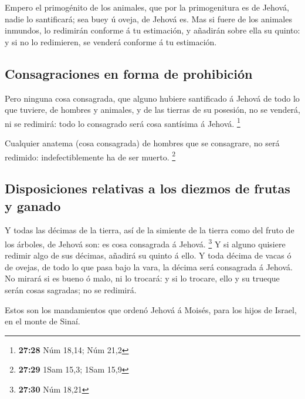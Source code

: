  Empero el primogénito de los animales, que por la
primogenitura es de Jehová, nadie lo santificará; sea buey ú oveja, de
Jehová es.  Mas si fuere de los animales inmundos, lo
redimirán conforme á tu estimación, y añadirán sobre ella su quinto: y
si no lo redimieren, se venderá conforme á tu estimación.

\hypertarget{consagraciones-en-forma-de-prohibiciuxf3n}{%
\subsection{Consagraciones en forma de
prohibición}\label{consagraciones-en-forma-de-prohibiciuxf3n}}

 Pero ninguna cosa consagrada, que alguno hubiere
santificado á Jehová de todo lo que tuviere, de hombres y animales, y de
las tierras de su posesión, no se venderá, ni se redimirá: todo lo
consagrado será cosa santísima á Jehová. \footnote{\textbf{27:28} Núm
  18,14; Núm 21,2}

 Cualquier anatema (cosa consagrada) de hombres que se
consagrare, no será redimido: indefectiblemente ha de ser muerto.
\footnote{\textbf{27:29} 1Sam 15,3; 1Sam 15,9}

\hypertarget{disposiciones-relativas-a-los-diezmos-de-frutas-y-ganado}{%
\subsection{Disposiciones relativas a los diezmos de frutas y
ganado}\label{disposiciones-relativas-a-los-diezmos-de-frutas-y-ganado}}

 Y todas las décimas de la tierra, así de la simiente de la
tierra como del fruto de los árboles, de Jehová son: es cosa consagrada
á Jehová. \footnote{\textbf{27:30} Núm 18,21}  Y si alguno
quisiere redimir algo de sus décimas, añadirá su quinto á ello.
 Y toda décima de vacas ó de ovejas, de todo lo que pasa
bajo la vara, la décima será consagrada á Jehová.  No
mirará si es bueno ó malo, ni lo trocará: y si lo trocare, ello y su
trueque serán cosas sagradas; no se redimirá.

 Estos son los mandamientos que ordenó Jehová á Moisés,
para los hijos de Israel, en el monte de Sinaí.

